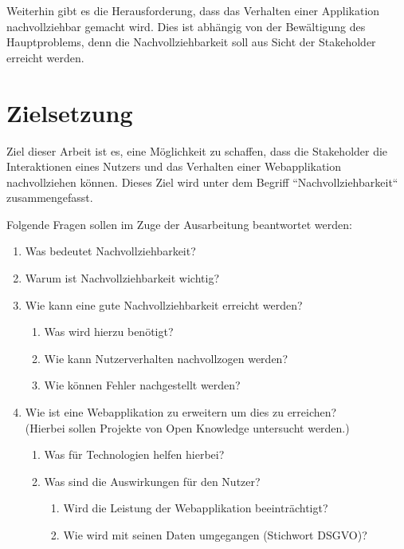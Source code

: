 Weiterhin gibt es die Herausforderung, dass das Verhalten einer Applikation nachvollziehbar gemacht wird. Dies ist abhängig von der Bewältigung des Hauptproblems, denn die Nachvollziehbarkeit soll aus Sicht der Stakeholder erreicht werden.

\section{Zielsetzung}


Ziel dieser Arbeit ist es, eine Möglichkeit zu schaffen, dass die Stakeholder die Interaktionen eines Nutzers und das Verhalten einer Webapplikation nachvollziehen können. Dieses Ziel wird unter dem Begriff ``Nachvollziehbarkeit`` zusammengefasst.

Folgende Fragen sollen im Zuge der Ausarbeitung beantwortet werden:


\begin{enumerate}
	\item Was bedeutet Nachvollziehbarkeit?
	\item Warum ist Nachvollziehbarkeit wichtig?
	\item Wie kann eine gute Nachvollziehbarkeit erreicht werden?
	\begin{enumerate}
		\item Was wird hierzu benötigt?
		\item Wie kann Nutzerverhalten nachvollzogen werden?
		\item Wie können Fehler nachgestellt werden?
	\end{enumerate}
	\item Wie ist eine Webapplikation zu erweitern um dies zu erreichen? \\ (Hierbei sollen Projekte von Open Knowledge untersucht werden.)
	\begin{enumerate}
		\item Was für Technologien helfen hierbei?
		\item Was sind die Auswirkungen für den Nutzer?
		\begin{enumerate}
			\item Wird die Leistung der Webapplikation beeinträchtigt?
			\item Wie wird mit seinen Daten umgegangen (Stichwort DSGVO)?
		\end{enumerate}
	\end{enumerate}
\end{enumerate}


